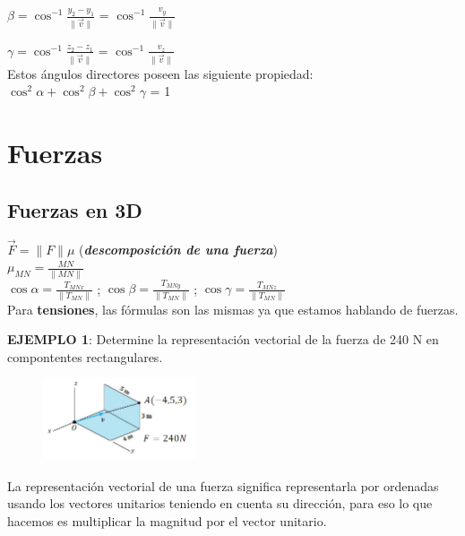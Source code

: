 \documentclass[letterpaper,12pt]{article}
\begin{document}
\begin{sloppypar}
\begin{center}
    $\displaystyle \beta = \cos^{-1} \frac{y_2-y_1}{\| \vec{v} \| }$ = $\displaystyle \cos^{-1} \frac{v_y}{\| \vec{v} \| }$
    
    $\displaystyle \gamma = \cos^{-1} \frac{z_2-z_1}{\| \vec{v} \| }$ = $\displaystyle \cos^{-1} \frac{v_z}{\| \vec{v} \| }$
    \vspace{0.3cm}\\
    \noindent Estos ángulos directores poseen las siguiente propiedad:
    \vspace{0.3cm}\\
    $\cos ^{2} \alpha + \cos ^{2} \beta + \cos ^{2} \gamma$ = 1
\end{center}

\section{Fuerzas}
\subsection{Fuerzas en 3D}
\begin{center}
    $\vec{F} = \|F\| \mu$  \textcolor[rgb]{1,0,0}{(\textbf{\textit{descomposición de una fuerza}})} 
    \vspace{0.3cm}\\
    $\displaystyle \mu_{MN} = \frac{MN}{\|MN\|}$
    \vspace{0.3cm}\\
    $\displaystyle \cos \alpha = \frac{T_{MNx}}{\|T_{MN}\|}$ ; $\displaystyle \cos \beta = \frac{T_{MNy}}{\|T_{MN}\|}$ ; $\displaystyle \cos \gamma = \frac{T_{MNz}}{\|T_{MN}\|}$
    \vspace{0.3cm}\\
    Para \textbf{tensiones}, las fórmulas son las mismas ya que estamos hablando de fuerzas.
\end{center}
\noindent \textbf{EJEMPLO 1}: Determine la representación vectorial de la fuerza de 240 N en compontentes rectangulares.
\begin{figure}[H]
    \centering
     \includegraphics[width=0.4\textwidth]{images/vector.PNG}
\end{figure}
\noindent La representación vectorial de una fuerza significa representarla por ordenadas usando los vectores unitarios teniendo en cuenta su dirección, para eso lo que hacemos es multiplicar la magnitud por el vector unitario.


\end{sloppypar}
\end{document}

